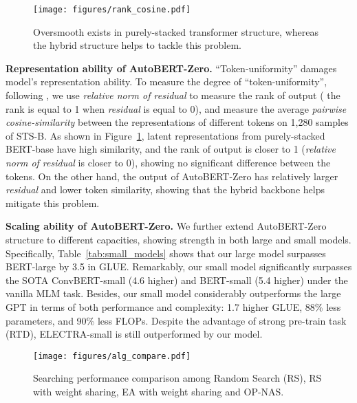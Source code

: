 \documentclass[letterpaper]{article} \usepackage{aaai22}  \usepackage{times}  \usepackage{helvet}  \usepackage{courier}  \usepackage[hyphens]{url}  \usepackage{graphicx} \urlstyle{rm} \def\UrlFont{\rm}  \usepackage{natbib}  \usepackage{caption} \DeclareCaptionStyle{ruled}{labelfont=normalfont,labelsep=colon,strut=off} \frenchspacing  \setlength{\pdfpagewidth}{8.5in}  \setlength{\pdfpageheight}{11in}  \usepackage{algorithm}
\begin{document}
\begin{figure}[t]
\centering
	\vspace{-4mm}
	\texttt{[image: figures/rank\_cosine.pdf]}
	\vspace{-3mm}	
	\caption{\small{Oversmooth exists in purely-stacked transformer structure, whereas the hybrid structure helps to tackle this problem.}}
	\vspace{-5.5mm}
	\label{fig:cosine_rank}
\end{figure}




\textbf{Representation ability of AutoBERT-Zero.} ``Token-uniformity'' damages model's representation ability. To measure the degree of ``token-uniformity'', following \citep{dong2021attentionnot,gong2021improve}, 
we use \textit{relative norm of residual
} to measure the rank of output ( the rank is equal to 1 when \textit{residual} is equal to 0), and measure the average \textit{pairwise cosine-similarity} between the representations of different tokens on 1,280 samples of STS-B. As shown in Figure~\ref{fig:cosine_rank}, latent representations from purely-stacked BERT-base have high similarity, and the rank of output is closer to 1 (\textit{relative norm of residual} is closer to 0), showing no significant difference between the tokens. On the other hand, the output of AutoBERT-Zero has relatively larger \textit{residual} and lower token similarity, showing that the hybrid backbone helps mitigate this problem.



\textbf{Scaling ability of AutoBERT-Zero.}
We further extend AutoBERT-Zero structure to different capacities, 
showing strength in both large and small models. Specifically, Table~\ref{tab:small_models} shows that our large model surpasses BERT-large by 3.5 in GLUE. 
Remarkably, our small model significantly surpasses the SOTA ConvBERT-small (4.6 higher) and BERT-small (5.4 higher) under the vanilla MLM task. Besides, our small model considerably outperforms the large GPT in terms of both performance and complexity:  1.7 higher GLUE, 88\% less parameters, and 90\% less FLOPs. 
Despite the advantage of strong pre-train task (RTD), ELECTRA-small is still outperformed by our model.



\begin{figure}[t]
\vspace{-4mm}
\centering
\texttt{[image: figures/alg\_compare.pdf]}
\vspace{-2mm}	
\caption{\small{Searching performance comparison among Random Search (RS), RS with weight sharing, EA with weight sharing and OP-NAS.}}
\label{fig:search_algorithms}
\vspace{-5.5mm}
\end{figure}
\end{document}
